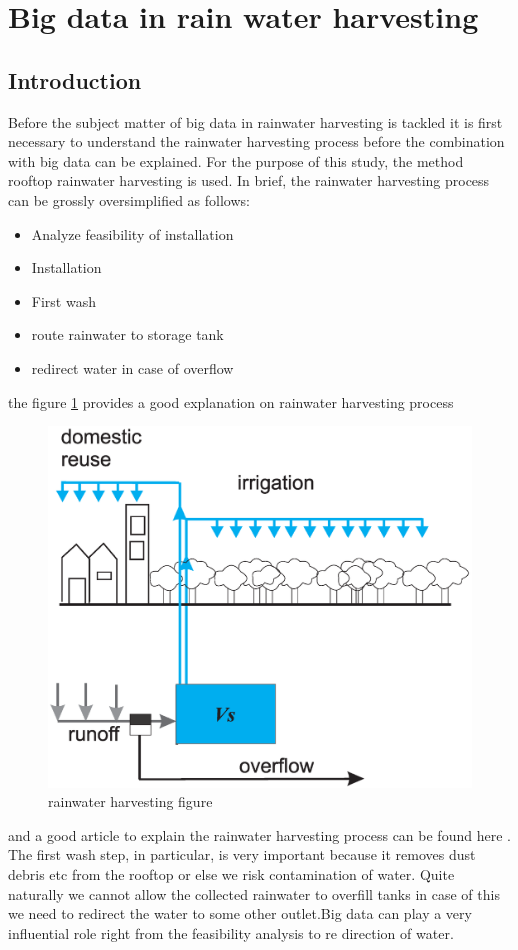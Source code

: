 \documentclass[sigconf]{acmart}
\begin{document}
\section{Big data in rain water harvesting}

\subsection{Introduction}
Before the subject matter of big data in rainwater harvesting is tackled it is first necessary to understand the rainwater harvesting process before the combination with big data can be explained. For the purpose of this study, the method rooftop rainwater harvesting is used. In brief, the rainwater harvesting process can be grossly oversimplified as follows:
\begin{itemize}
  \item Analyze feasibility of installation
  \item Installation
  \item First wash
  \item route rainwater to storage tank
  \item redirect water in case of overflow
\end{itemize}
the figure \ref{f:water} provides a good explanation on rainwater harvesting process
\begin{figure}[!ht]
  \centering\includegraphics[width=\columnwidth]{images/water.pdf}
  \caption{rainwater harvesting figure}\label{f:water}
\end{figure} 
and a good article to explain the rainwater harvesting process can be found here \cite{Wikipedia2016}. The first wash step, in particular, is very important because it removes dust debris etc from the rooftop or else we risk contamination of water. Quite naturally we cannot allow the collected rainwater to overfill tanks in case of this we need to redirect the water to some other outlet.Big data can play a very influential role right from the feasibility analysis to re direction of water.
\end{document}
